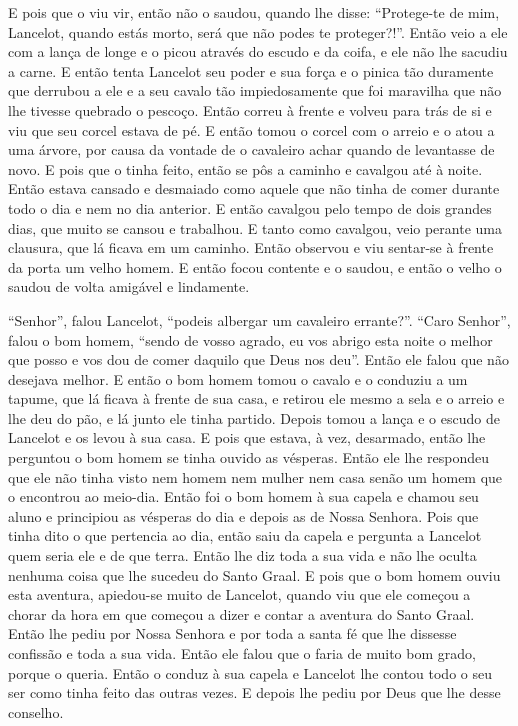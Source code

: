 E pois que o viu vir, então não o saudou, quando lhe disse: “Protege-te de
mim, Lancelot, quando estás morto, será que não podes te proteger?!”. Então
veio a ele com a lança de longe e o picou através do escudo e da coifa, e ele
não lhe sacudiu a carne. E então tenta Lancelot seu poder e sua força e o
pinica tão duramente que derrubou a ele e a seu cavalo tão impiedosamente que
foi maravilha que não lhe tivesse quebrado o pescoço. Então correu à frente e
volveu para trás de si e viu que seu corcel estava de pé. E então tomou o
corcel com o arreio e o atou a uma árvore, por causa da vontade de o cavaleiro
achar quando de levantasse de novo. E pois que o tinha feito, então se pôs a
caminho e cavalgou até à noite. Então estava cansado e desmaiado como aquele
que não tinha de comer durante todo o dia e nem no dia anterior. E então
cavalgou pelo tempo de dois grandes dias, que muito se cansou e trabalhou. E
tanto como cavalgou, veio perante uma clausura, que lá ficava em um caminho.
Então observou e viu sentar-se à frente da porta um velho homem. E então focou
contente e o saudou, e então o velho o saudou de volta amigável e lindamente. 

“Senhor”, falou Lancelot, “podeis albergar um cavaleiro errante?”. “Caro
Senhor”, falou o bom homem, “sendo de vosso agrado, eu vos abrigo esta noite o
melhor que posso e vos dou de comer daquilo que Deus nos deu”. Então ele falou
que não desejava melhor. E então o bom homem tomou o cavalo e o conduziu a um
tapume, que lá ficava à frente de sua casa, e retirou ele mesmo a sela e o
arreio e lhe deu do pão, e lá junto ele tinha partido. Depois tomou a lança e o
escudo de Lancelot e os levou à sua casa. E pois que estava, à vez, desarmado,
então lhe perguntou o bom homem se tinha ouvido as vésperas. Então ele lhe
respondeu que ele não tinha visto nem homem nem mulher nem casa senão um homem
que o encontrou ao meio-dia. Então foi o bom homem à sua capela e chamou seu
aluno e principiou as vésperas do dia e depois as de Nossa Senhora. Pois que
tinha dito o que pertencia ao dia, então saiu da capela e pergunta a Lancelot
quem seria ele e de que terra. Então lhe diz toda a sua vida e não lhe oculta
nenhuma coisa que lhe sucedeu do Santo Graal. E pois que o bom homem ouviu esta
aventura, apiedou-se muito de Lancelot, quando viu que ele começou a chorar da
hora em que começou a dizer e contar a aventura do Santo Graal. Então lhe pediu
por Nossa Senhora e por toda a santa fé que lhe dissesse confissão e toda a sua
vida. Então ele falou que o faria de muito bom grado, porque o queria. Então o
conduz à sua capela e Lancelot lhe contou todo o seu ser como tinha feito das
outras vezes. E depois lhe pediu por Deus que lhe desse conselho.

